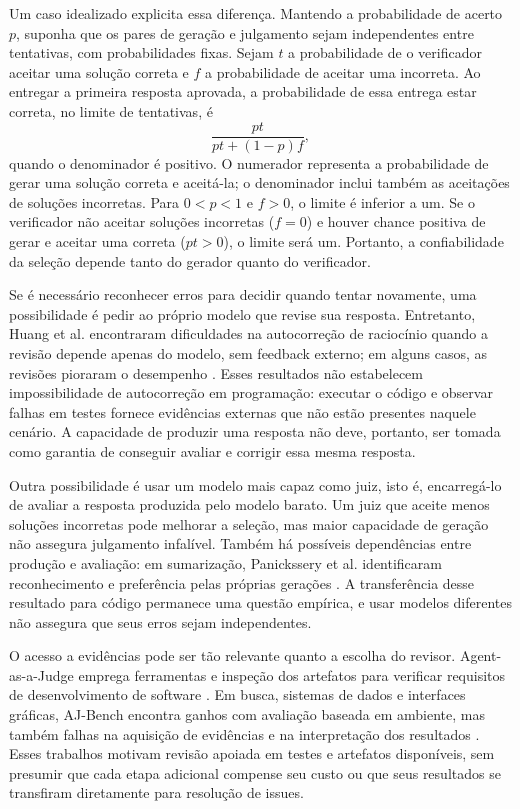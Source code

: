 Um caso idealizado explicita essa diferença. Mantendo a probabilidade de acerto $p$, suponha que os pares de geração e julgamento sejam independentes entre tentativas, com probabilidades fixas. Sejam $t$ a probabilidade de o verificador aceitar uma solução correta e $f$ a probabilidade de aceitar uma incorreta. Ao entregar a primeira resposta aprovada, a probabilidade de essa entrega estar correta, no limite de tentativas, é
\begin{equation}
\frac{pt}{pt+(1-p)f},
\end{equation}
quando o denominador é positivo. O numerador representa a probabilidade de gerar uma solução correta e aceitá-la; o denominador inclui também as aceitações de soluções incorretas. Para $0<p<1$ e $f>0$, o limite é inferior a um. Se o verificador não aceitar soluções incorretas ($f=0$) e houver chance positiva de gerar e aceitar uma correta ($pt>0$), o limite será um. Portanto, a confiabilidade da seleção depende tanto do gerador quanto do verificador.

Se é necessário reconhecer erros para decidir quando tentar novamente, uma possibilidade é pedir ao próprio modelo que revise sua resposta. Entretanto, Huang et al. encontraram dificuldades na autocorreção de raciocínio quando a revisão depende apenas do modelo, sem feedback externo; em alguns casos, as revisões pioraram o desempenho \cite{Huang2024SelfCorrect}. Esses resultados não estabelecem impossibilidade de autocorreção em programação: executar o código e observar falhas em testes fornece evidências externas que não estão presentes naquele cenário. A capacidade de produzir uma resposta não deve, portanto, ser tomada como garantia de conseguir avaliar e corrigir essa mesma resposta.

Outra possibilidade é usar um modelo mais capaz como juiz, isto é, encarregá-lo de avaliar a resposta produzida pelo modelo barato. Um juiz que aceite menos soluções incorretas pode melhorar a seleção, mas maior capacidade de geração não assegura julgamento infalível. Também há possíveis dependências entre produção e avaliação: em sumarização, Panickssery et al. identificaram reconhecimento e preferência pelas próprias gerações \cite{Panickssery2024SelfPreference}. A transferência desse resultado para código permanece uma questão empírica, e usar modelos diferentes não assegura que seus erros sejam independentes.

O acesso a evidências pode ser tão relevante quanto a escolha do revisor. Agent-as-a-Judge emprega ferramentas e inspeção dos artefatos para verificar requisitos de desenvolvimento de software \cite{Zhuge2024AgentJudge}. Em busca, sistemas de dados e interfaces gráficas, AJ-Bench encontra ganhos com avaliação baseada em ambiente, mas também falhas na aquisição de evidências e na interpretação dos resultados \cite{Shi2026AJBench}. Esses trabalhos motivam revisão apoiada em testes e artefatos disponíveis, sem presumir que cada etapa adicional compense seu custo ou que seus resultados se transfiram diretamente para resolução de issues.

